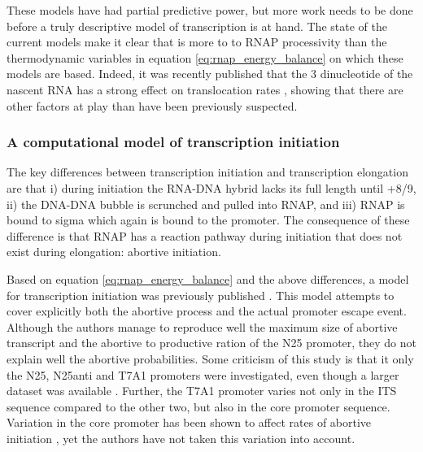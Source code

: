 These models have had partial predictive power, but more work needs to be done
before a truly descriptive model of transcription is at hand. The state of the
current models make it clear that is more to to RNAP processivity than the
thermodynamic variables in equation \eqref{eq:rnap_energy_balance} on which
these models are based. Indeed, it was recently published that the 3\p
dinucleotide of the nascent RNA has a strong effect on translocation rates
\cite{hein_rna_2011}, showing that there are other factors at play than have
been previously suspected.

\subsubsection{A computational model of transcription initiation}
The key differences between transcription initiation and transcription
elongation are that i) during initiation the RNA-DNA hybrid lacks its full
length until +8/9, ii) the DNA-DNA bubble is scrunched and pulled into RNAP,
and iii) RNAP is bound to sigma which again is bound to the promoter. The
consequence of these difference is that RNAP has a reaction pathway during
initiation that does not exist during elongation: abortive initiation.

Based on equation \eqref{eq:rnap_energy_balance} and the above differences, a
model for transcription initiation was previously published
\cite{xue_kinetic_2008}. This model attempts to cover explicitly both the
abortive process and the actual promoter escape event. Although the authors
manage to reproduce well the maximum size of abortive transcript and the
abortive to productive ration of the N25 promoter, they do not explain well the
abortive probabilities. Some criticism of this study is that it only the N25,
N25anti and T7A1 promoters were investigated, even though a larger dataset was
available \cite{hsu_initial_2006}. Further, the T7A1 promoter varies not only
in the ITS sequence compared to the other two, but also in the core promoter
sequence. Variation in the core promoter has been shown to affect rates of
abortive initiation \cite{vo_vitro_2003-1}, yet the authors have not taken
this variation into account.
